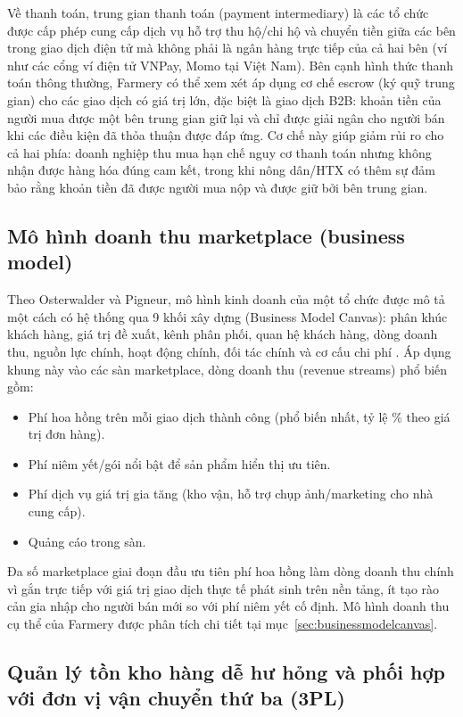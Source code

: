 Về thanh toán, trung gian thanh toán (payment intermediary) là các tổ chức được cấp phép cung cấp dịch vụ hỗ trợ thu hộ/chi hộ và chuyển tiền giữa các bên trong giao dịch điện tử mà không phải là ngân hàng trực tiếp của cả hai bên (ví như các cổng ví điện tử VNPay, Momo tại Việt Nam). Bên cạnh hình thức thanh toán thông thường, Farmery có thể xem xét áp dụng cơ chế escrow (ký quỹ trung gian) cho các giao dịch có giá trị lớn, đặc biệt là giao dịch B2B: khoản tiền của người mua được một bên trung gian giữ lại và chỉ được giải ngân cho người bán khi các điều kiện đã thỏa thuận được đáp ứng. Cơ chế này giúp giảm rủi ro cho cả hai phía: doanh nghiệp thu mua hạn chế nguy cơ thanh toán nhưng không nhận được hàng hóa đúng cam kết, trong khi nông dân/HTX có thêm sự đảm bảo rằng khoản tiền đã được người mua nộp và được giữ bởi bên trung gian.

\subsection{Mô hình doanh thu marketplace (business model)}
\label{subsec:businessmodel}

Theo Osterwalder và Pigneur, mô hình kinh doanh của một tổ chức được mô tả một cách có hệ thống qua 9 khối xây dựng (Business Model Canvas): phân khúc khách hàng, giá trị đề xuất, kênh phân phối, quan hệ khách hàng, dòng doanh thu, nguồn lực chính, hoạt động chính, đối tác chính và cơ cấu chi phí \parencite{osterwalder2010bmc}. Áp dụng khung này vào các sàn marketplace, dòng doanh thu (revenue streams) phổ biến gồm:
\begin{itemize}
    \item Phí hoa hồng trên mỗi giao dịch thành công (phổ biến nhất, tỷ lệ \% theo giá trị đơn hàng).
    \item Phí niêm yết/gói nổi bật để sản phẩm hiển thị ưu tiên.
    \item Phí dịch vụ giá trị gia tăng (kho vận, hỗ trợ chụp ảnh/marketing cho nhà cung cấp).
    \item Quảng cáo trong sàn.
\end{itemize}
Đa số marketplace giai đoạn đầu ưu tiên phí hoa hồng làm dòng doanh thu chính vì gắn trực tiếp với giá trị giao dịch thực tế phát sinh trên nền tảng, ít tạo rào cản gia nhập cho người bán mới so với phí niêm yết cố định. Mô hình doanh thu cụ thể của Farmery được phân tích chi tiết tại mục~\ref{sec:businessmodelcanvas}.

\subsection{Quản lý tồn kho hàng dễ hư hỏng và phối hợp với đơn vị vận chuyển thứ ba (3PL)}
\label{subsec:khobai}

